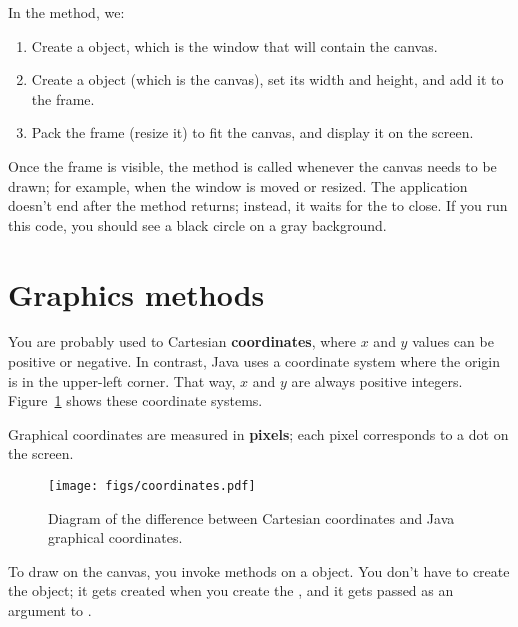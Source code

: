 
In the  method, we:

\begin{enumerate}

\item Create a  object, which is the window that will contain the canvas.

\item Create a  object (which is the canvas), set its width and height, and add it to the frame.

\item Pack the frame (resize it) to fit the canvas, and display it on the screen.
\end{enumerate}


Once the frame is visible, the  method is called whenever the canvas needs to be drawn; for example, when the window is moved or resized.
The application doesn't end after the  method returns; instead, it waits for the  to close.
If you run this code, you should see a black circle on a gray background.


\section{Graphics methods}


You are probably used to Cartesian {\bf coordinates}, where $x$ and $y$ values can be positive or negative.
In contrast, Java uses a coordinate system where the origin is in the upper-left corner.
That way, $x$ and $y$ are always positive integers.
Figure~\ref{fig.coordinates} shows these coordinate systems.

Graphical coordinates are measured in {\bf pixels}; each pixel corresponds to a dot on the screen.

\begin{figure}[!ht]
\begin{center}
\texttt{[image: figs/coordinates.pdf]}
\caption{Diagram of the difference between Cartesian coordinates and Java graphical coordinates.}
\label{fig.coordinates}
\end{center}
\end{figure}

To draw on the canvas, you invoke methods on a  object.
You don't have to create the  object; it gets created when you create the , and it gets passed as an argument to .

